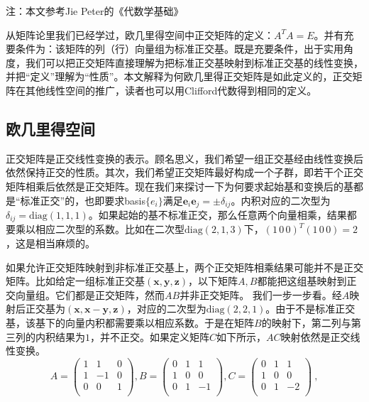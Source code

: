 注：本文参考Jie Peter的《代数学基础》

从矩阵论里我们已经学过，欧几里得空间中正交矩阵的定义：$A^T A=E$。并有充要条件为：该矩阵的列（行）向量组为标准正交基。既是充要条件，出于实用角度，我们可以把正交矩阵直接理解为把标准正交基映射到标准正交基的线性变换，并把“定义”理解为“性质”。本文解释为何欧几里得正交矩阵是如此定义的，正交矩阵在其他线性空间的推广，读者也可以用Clifford代数得到相同的定义。
\subsection{欧几里得空间}
正交矩阵是正交线性变换的表示。顾名思义，我们希望一组正交基经由线性变换后依然保持正交的性质。其次，我们希望正交矩阵最好构成一个子群，即若干个正交矩阵相乘后依然是正交矩阵。现在我们来探讨一下为何要求起始基和变换后的基都是“标准正交”的，也即要求basis$\{e_i\}$满足$\boldsymbol{e}_i\boldsymbol{e}_j=\pm\delta_{ij}$。内积对应的二次型为$\delta_{ij}=\mathrm {diag}(1,1,1)$。如果起始的基不标准正交，那么任意两个向量相乘，结果都要乘以相应二次型的系数。比如在二次型$\mathrm {diag}(2,1,3)$下，$(1\,0\,0)^T (1\,0\,0)=2$，这是相当麻烦的。


如果允许正交矩阵映射到非标准正交基上，两个正交矩阵相乘结果可能并不是正交矩阵。比如给定一组标准正交基$(\boldsymbol x,\boldsymbol y,\boldsymbol z)$，以下矩阵$A,B$都能把这组基映射到正交向量组。它们都是正交矩阵，然而$AB$并非正交矩阵。
我们一步一步看。经$A$映射后正交基为$(\boldsymbol x,\boldsymbol{x-y},\boldsymbol z)$，对应的二次型为$\mathrm {diag}(2,2,1)$。由于不是标准正交基，该基下的向量内积都需要乘以相应系数。于是在矩阵$B$的映射下，第二列与第三列的内积结果为$1$，并不正交。如果定义矩阵$C$如下所示，$AC$映射依然是正交线性变换。
\begin{equation}
A=\begin{pmatrix}
  1&  1&  0   \\
  1&  -1&  0  \\
  0& 0 & 1   \\
\end{pmatrix},
B=\begin{pmatrix}
  0&  1&  1   \\
  1&  0&  0  \\
  0& 1 & -1   \\
\end{pmatrix},
C=\begin{pmatrix}
  0&  1&  1   \\
  1&  0&  0  \\
  0& 1 & -2   \\
\end{pmatrix}~,
\end{equation}

